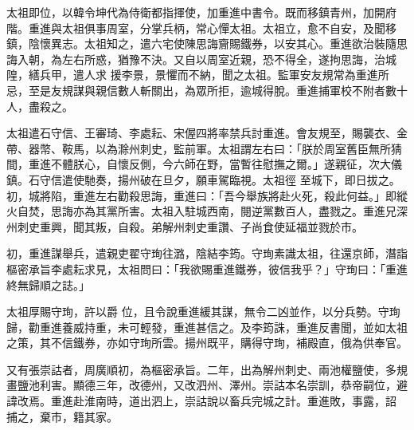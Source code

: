 \begin{pinyinscope}
 太祖即位，以韓令坤代為侍衛都指揮使，加重進中書令。既而移鎮青州，加開府階。重進與太祖俱事周室，分掌兵柄，常心憚太祖。太祖立，愈不自安，及聞移鎮，陰懷異志。太祖知之，遣六宅使陳思誨齎賜鐵券，以安其心。重進欲治裝隨思誨入朝，為左右所惑，猶豫不決。又自以周室近親，恐不得全，遂拘思誨，治城隍，繕兵甲，遣人求
 援李景，景懼而不納，聞之太祖。監軍安友規常為重進所忌，至是友規謀與親信數人斬關出，為眾所拒，逾城得脫。重進捕軍校不附者數十人，盡殺之。



 太祖遣石守信、王審琦、李處耘、宋偓四將率禁兵討重進。會友規至，賜襲衣、金帶、器幣、鞍馬，以為滁州刺史，監前軍。太祖謂左右曰：「朕於周室舊臣無所猜間，重進不體朕心，自懷反側，今六師在野，當暫往慰撫之爾。」遂親征，次大儀鎮。石守信遣使馳奏，揚州破在旦夕，願車駕臨視。太祖徑
 至城下，即日拔之。初，城將陷，重進左右勸殺思誨，重進曰：「吾今舉族將赴火死，殺此何益。」即縱火自焚，思誨亦為其黨所害。太祖入駐城西南，閱逆黨數百人，盡戮之。重進兄深州刺史重興，聞其叛，自殺。弟解州刺史重讚、子尚食使延福並戮於市。



 初，重進謀舉兵，遣親吏翟守珣往潞，陰結李筠。守珣素識太祖，往還京師，潛詣樞密承旨李處耘求見，太祖問曰：「我欲賜重進鐵券，彼信我乎？」守珣曰：「重進終無歸順之誌。」



 太祖厚賜守珣，許以爵
 位，且令說重進緩其謀，無令二凶並作，以分兵勢。守珣歸，勸重進養威持重，未可輕發，重進甚信之。及李筠誅，重進反書聞，並如太祖之策，其不信鐵券，亦如守珣所雲。揚州既平，購得守珣，補殿直，俄為供奉官。



 又有張崇詁者，周廣順初，為樞密承旨。二年，出為解州刺史、兩池權鹽使，多規畫鹽池利害。顯德三年，改德州，又改泗州、澤州。崇詁本名崇訓，恭帝嗣位，避諱改焉。重進赴淮南時，道出泗上，崇詁說以畜兵完城之計。重進敗，事露，詔
 捕之，棄市，籍其家。



\end{pinyinscope}